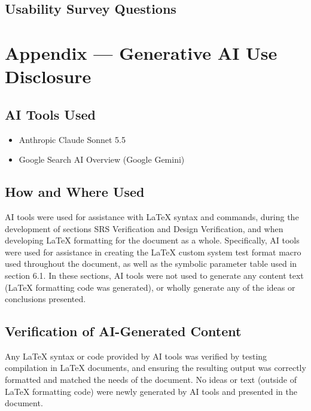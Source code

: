 \documentclass[12pt, titlepage]{article}
\begin{document}
\newpage
\subsection{Usability Survey Questions} \label{SurveyQ}



\newpage{}

\section{Appendix --- Generative AI Use Disclosure}

\subsection{AI Tools Used}

\begin{itemize}
	\item Anthropic Claude Sonnet 5.5
	\item Google Search AI Overview (Google Gemini)
\end{itemize}

\subsection{How and Where Used}

AI tools were used for assistance with LaTeX syntax and commands, during 
the development of sections SRS Verification and Design Verification, and when 
developing 
LaTeX formatting for the document as a whole. Specifically, AI tools were 
used for assistance in creating the LaTeX custom system test format macro 
used throughout the document, as well as the symbolic parameter table used in 
section 6.1. In these sections, 
AI tools were not used to generate any content text (LaTeX formatting code was 
generated), or wholly generate any of the 
ideas or conclusions presented.

\subsection{Verification of AI-Generated Content}

Any LaTeX syntax or code provided by AI tools was verified by testing 
compilation in LaTeX documents, and ensuring the resulting output was 
correctly formatted and matched the needs of the document. No ideas or text 
(outside of LaTeX formatting code) were 
newly generated by AI tools and presented in the document.
\end{document}
